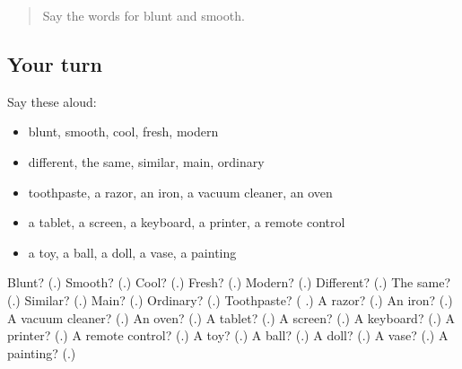 \begin{quote}
Say the words for blunt and smooth.
\end{quote}

\subsection*{Your turn}
Say these aloud:

\begin{itemize}
\raggedright
  \item blunt, smooth, cool, fresh, modern
  \item different, the same, similar, main, ordinary
  \item toothpaste, a razor, an iron, a vacuum cleaner, an oven
  \item a tablet, a screen, a keyboard, a printer, a remote control
  \item a toy, a ball, a doll, a vase, a painting
\end{itemize}

\begin{tcolorbox}[breakable,colback=teal!4,colframe=teal!35!black,title={Before you move on}]
Blunt? (\textbf{}.) Smooth? (\textbf{}.) Cool? (\textbf{}.) Fresh? (\textbf{}.) Modern? (\textbf{}.) Different? (\textbf{}.) The same? (\textbf{}.) Similar? (\textbf{}.) Main? (\textbf{}.) Ordinary? (\textbf{}.) Toothpaste? (\textbf{ }.) A razor? (\textbf{}.) An iron? (\textbf{}.) A vacuum cleaner? (\textbf{}.) An oven? (\textbf{}.) A tablet? (\textbf{}.) A screen? (\textbf{}.) A keyboard? (\textbf{}.) A printer? (\textbf{}.) A remote control? (\textbf{}.) A toy? (\textbf{}.) A ball? (\textbf{}.) A doll? (\textbf{}.) A vase? (\textbf{}.) A painting? (\textbf{}.)
\end{tcolorbox}
